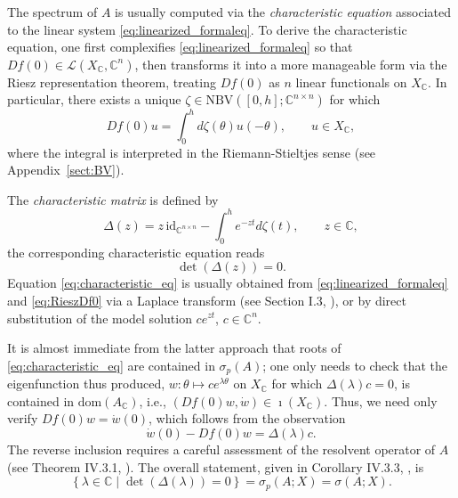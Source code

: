 \documentclass[a4paper, 12pt, oneside, reqno, notitlepage]{amsart}
\theoremstyle{plain}
\theoremstyle{definition}
\theoremstyle{remark}
\newcommand{\dom}{\mathrm{dom}}
\newcommand{\nbv}{\mathrm{NBV}}
\begin{document}
The spectrum of $A$ is usually computed via the \textit{characteristic equation} associated to the linear system \eqref{eq:linearized_formaleq}.
To derive the characteristic equation, one first 
complexifies \eqref{eq:linearized_formaleq} so that $Df(0) \in \mathcal{L}(X_\mathbb{C},\mathbb{C}^n)$, 
then transforms it into a more manageable form via the Riesz representation theorem, treating $Df(0)$ as $n$ linear functionals on $X_\mathbb{C}$.
In particular, there exists a unique $\zeta \in \nbv([0,h];\mathbb{C}^{n \times n})$ for which
\begin{equation}
    Df(0) u = \int_0^h d\zeta(\theta) u(-\theta) , \qquad u \in X_\mathbb{C},
    \label{eq:RieszDf0}
\end{equation}
where the integral is interpreted in the Riemann-Stieltjes sense (see Appendix~\ref{sect:BV}).

The \textit{characteristic matrix} is defined by
\begin{equation}
    \Delta (z) = z \, \mathrm{id}_{\mathbb{C}^{n \times n}} - \int_0^h e^{-zt} d\zeta(t), \qquad z \in \mathbb{C}, 
    \label{eq:characteristic_matrix}
\end{equation}
the corresponding characteristic equation reads 
\begin{equation}
    \det(\Delta (z)) = 0.
    \label{eq:characteristic_eq}
\end{equation}
Equation \eqref{eq:characteristic_eq} is usually obtained from \eqref{eq:linearized_formaleq} and \eqref{eq:RieszDf0} via a Laplace transform (see Section I.3, \cite{diekmann2012delay}), or by direct substitution of the model solution $c e^{z t}$, $c \in \mathbb{C}^n$.

It is almost immediate from the latter approach that roots of \eqref{eq:characteristic_eq} are contained in $\sigma_p(A)$; one only needs to check that the eigenfunction thus produced, $w : \theta \mapsto c e^{\lambda \theta}$ on $X_\mathbb{C}$ for which $\Delta(\lambda) c = 0$, is contained in $\dom(A_\mathbb{C})$, i.e., $(Df(0)w,\dot{w} )\in \imath(X_\mathbb{C})$.
Thus, we need only verify $Df(0)w = \dot{w}(0)$, which follows from the observation
\begin{displaymath}
    \dot{w}(0) - Df(0)w = \Delta(\lambda) c. 
\end{displaymath}
The reverse inclusion requires a careful assessment of the resolvent operator of $A$
(see Theorem IV.3.1, \cite{diekmann2012delay}).
The overall statement, 
given in Corollary IV.3.3, \cite{diekmann1987perturbed},
is 
\begin{equation}
    \left\{ \lambda \in \mathbb{C} \; \big| \; \det(\Delta(\lambda)) = 0 \right\} = \sigma_p(A;X) = \sigma(A;X).
    \label{eq:charact_equal_spect}
\end{equation}
\end{document}
